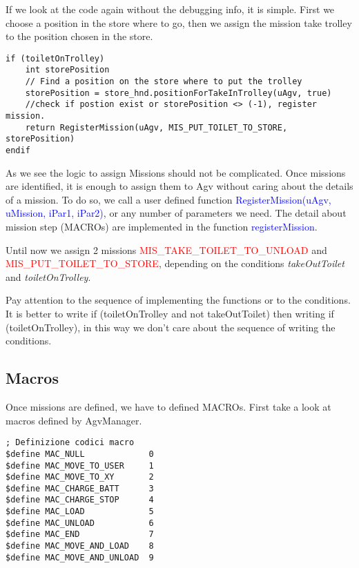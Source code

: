If we look at the code again without the debugging info, it is simple. First we choose a position in the store where to go, then we assign the mission take trolley to the position chosen in the store.

\begin{lstlisting}[caption= Mission take full trolley to a postion in the store]
if (toiletOnTrolley)
	int storePosition
	// Find a position on the store where to put the trolley
	storePosition = store_hnd.positionForTakeInTrolley(uAgv, true)
	//check if postion exist or storePosition <> (-1), register mission.
	return RegisterMission(uAgv, MIS_PUT_TOILET_TO_STORE, storePosition)
endif
\end{lstlisting} 

As we see the logic to assign Missions should not be complicated. Once missions are identified, it is enough to assign them to Agv without caring about the details of a mission. To do so, we call a user defined function \textcolor{blue}{ RegisterMission(uAgv, uMission, iPar1, iPar2)}, or any number of parameters we need. The detail about mission step (MACROs) are implemented in the function \textcolor{blue}{registerMission}.

Until now we assign 2 missions \textcolor{red}{MIS\_TAKE\_TOILET\_TO\_UNLOAD} and  \textcolor{red}{MIS\_PUT\_TOILET\_TO\_STORE}, depending on the conditions \textit{takeOutToilet} and \textit{toiletOnTrolley}.

Pay attention to the sequence of implementing the functions or to the conditions. It is better to write if (toiletOnTrolley and not takeOutToilet) then writing if (toiletOnTrolley), in this way we don't care about the sequence of writing the conditions.



%
\subsection{Macros}
Once missions are defined, we have to defined MACROs. First take a look at macros defined by AgvManager.

\begin{lstlisting}[caption= MACRO defined in AgvManager]
; Definizione codici macro
$define MAC_NULL             0
$define MAC_MOVE_TO_USER     1
$define MAC_MOVE_TO_XY       2
$define MAC_CHARGE_BATT      3
$define MAC_CHARGE_STOP      4
$define MAC_LOAD             5
$define MAC_UNLOAD           6
$define MAC_END              7
$define MAC_MOVE_AND_LOAD    8
$define MAC_MOVE_AND_UNLOAD  9
\end{lstlisting}


